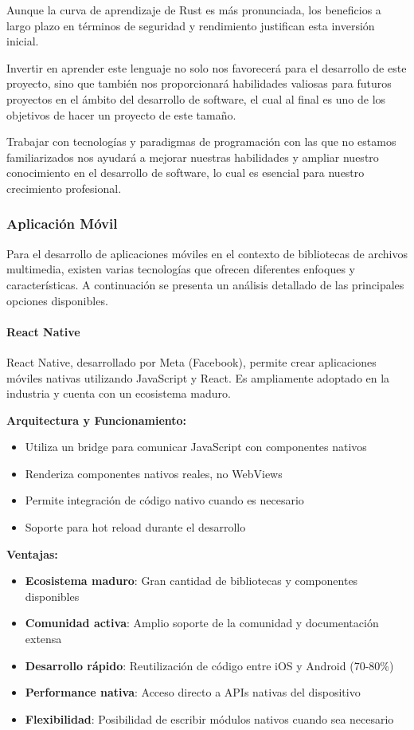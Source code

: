 Aunque la curva de aprendizaje de Rust es más pronunciada, los beneficios a largo plazo en términos de seguridad y rendimiento justifican esta inversión inicial.

Invertir en aprender este lenguaje no solo nos favorecerá para el desarrollo de este proyecto, sino que también nos proporcionará habilidades valiosas para futuros proyectos en el ámbito del desarrollo de software, el cual al final es uno de los objetivos de hacer un proyecto de este tamaño.

Trabajar con tecnologías y paradigmas de programación con las que no estamos familiarizados nos ayudará a mejorar nuestras habilidades y ampliar nuestro conocimiento en el desarrollo de software, lo cual es esencial para nuestro crecimiento profesional.

\subsubsection{Aplicación Móvil}

Para el desarrollo de aplicaciones móviles en el contexto de bibliotecas de archivos multimedia, existen varias tecnologías que ofrecen diferentes enfoques y características. A continuación se presenta un análisis detallado de las principales opciones disponibles.

\paragraph{React Native}

React Native, desarrollado por Meta (Facebook), permite crear aplicaciones móviles nativas utilizando JavaScript y React. Es ampliamente adoptado en la industria y cuenta con un ecosistema maduro.

\textbf{Arquitectura y Funcionamiento:}
\begin{itemize}
    \item Utiliza un \gls{bridge} para comunicar JavaScript con componentes nativos
    \item Renderiza componentes nativos reales, no WebViews
    \item Permite integración de código nativo cuando es necesario
    \item Soporte para hot reload durante el desarrollo
\end{itemize}

\textbf{Ventajas:}
\begin{itemize}
    \item \textbf{Ecosistema maduro}: Gran cantidad de bibliotecas y componentes disponibles
    \item \textbf{Comunidad activa}: Amplio soporte de la comunidad y documentación extensa
    \item \textbf{Desarrollo rápido}: Reutilización de código entre iOS y Android (70-80\%)
    \item \textbf{Performance nativa}: Acceso directo a APIs nativas del dispositivo
    \item \textbf{Flexibilidad}: Posibilidad de escribir módulos nativos cuando sea necesario
\end{itemize}

